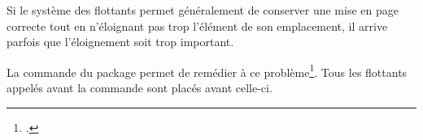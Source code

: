 Si le système des flottants permet généralement de conserver une mise en page correcte tout en n'éloignant pas trop l'élément de son emplacement, il arrive parfois que l'éloignement soit trop important.

La commande  du package  permet de remédier à ce problème\footcite{placeins}. 
Tous les flottants appelés avant la commande sont placés avant celle-ci.






    
